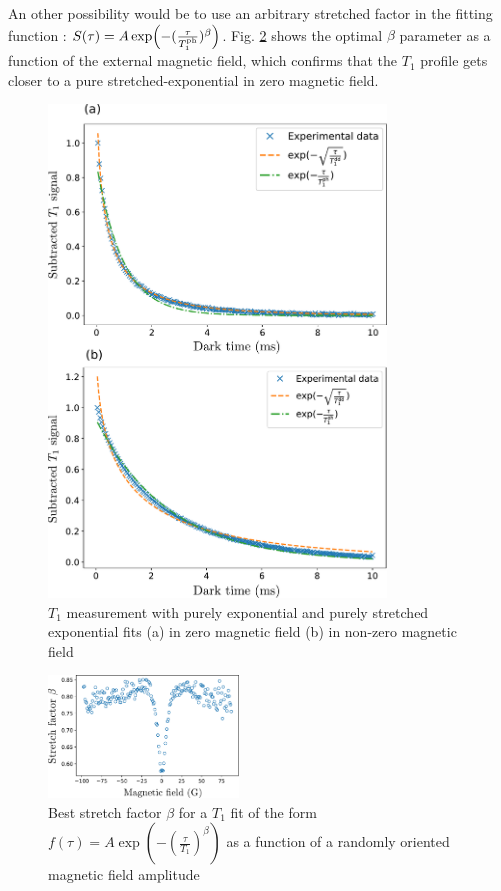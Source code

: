 \documentclass[preprintnumbers,amsmath,amssymb,onecolumn,12pt]{revtex4-2}
\begin{document}
An other possibility would be to use an arbitrary stretched factor in the fitting function : $S(\tau)=A \exp (-(\frac{\tau}{T_1^{\rm ph}})^\beta )$. Fig. \ref{alphas} shows the optimal $\beta$ parameter as a function of the external magnetic field, which confirms that the $T_1$ profile gets closer to a pure stretched-exponential in zero magnetic field.
\begin{figure}
\includegraphics[width=0.8\textwidth]{Figures_SI/Fig_T1_combined}
\caption{$T_1$ measurement with purely exponential and purely stretched exponential fits (a) in zero magnetic field (b) in non-zero magnetic field}
\label{T1_fits}
\end{figure}
\begin{figure}
\includegraphics[width=0.45\textwidth]{Figures_SI/fig_alphas}
\caption{Best stretch factor $\beta$ for a $T_1$ fit of the form $f(\tau)=A \exp(-(\frac{\tau}{T_1})^\beta)$ as a function of a randomly oriented magnetic field amplitude}
\label{alphas}
\end{figure}
\end{document}
